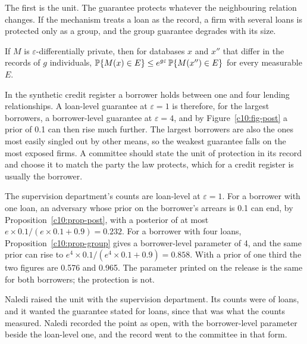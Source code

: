The first is the unit. The guarantee protects whatever the neighbouring relation
changes. If the mechanism treats a loan as the record, a firm with several loans is
protected only as a group, and the group guarantee degrades with its size.

\begin{proposition}[Groups]\label{c10:prop-group}
If $M$ is $\varepsilon$-differentially private, then for databases $x$ and $x''$
that differ in the records of $g$ individuals,
$\mathbb{P}\{M(x) \in E\} \le e^{g\varepsilon}\,\mathbb{P}\{M(x'') \in E\}$ for every
measurable $E$.
\end{proposition}

In the synthetic credit register a borrower holds between one and four lending
relationships.
A loan-level guarantee at $\varepsilon = 1$ is therefore, for the largest
borrowers, a borrower-level guarantee at $\varepsilon = 4$, and by
Figure~\ref{c10:fig-post} a prior of 0.1 can then rise much further. The
largest borrowers are also the ones most easily singled out by other means, so the
weakest guarantee falls on the most exposed firms. A committee should state the
unit of protection in its record and choose it to match the party the law
protects, which for a credit register is usually the borrower.

\begin{example}\label{c10:ex-four}
The supervision department's counts are loan-level at $\varepsilon = 1$. For a borrower
with one loan, an adversary whose prior on the borrower's arrears is 0.1 can end, by
Proposition~\ref{c10:prop-post}, with a posterior of at most
$e \times 0.1/(e \times 0.1 + 0.9) = 0.232$. For a borrower with four loans,
Proposition~\ref{c10:prop-group} gives a borrower-level parameter of 4, and the same
prior can rise to $e^4 \times 0.1/(e^4 \times 0.1 + 0.9) = 0.858$. With a prior of one
third the two figures are 0.576 and 0.965. The parameter printed on the release is the
same for both borrowers; the protection is not.
\end{example}

Naledi raised the unit with the supervision department. Its counts were of loans, and it
wanted the guarantee stated for loans, since that was what the counts measured. Naledi
recorded the point as open, with the borrower-level parameter beside the loan-level one,
and the record went to the committee in that form.


